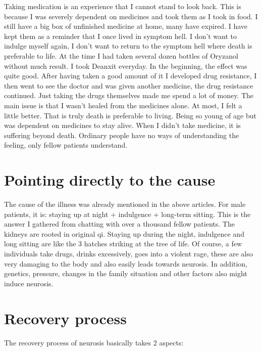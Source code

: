 \documentclass[
]{book}
\begin{document}
Taking medication is an experience that I cannot stand to look back. This is because I was severely dependent on medicines and took them as I took in food. I still have a big box of unfinished medicine at home, many have expired. I have kept them as a reminder that I once lived in symptom hell. I don't want to indulge myself again, I don't want to return to the symptom hell where death is preferable to life. At the time I had taken several dozen bottles of Oryzanol without much result. I took Deanxit everyday. In the beginning, the effect was quite good. After having taken a good amount of it I developed drug resistance, I then went to see the doctor and was given another medicine, the drug resistance continued. Just taking the drugs themselves made me spend a lot of money. The main issue is that I wasn't healed from the medicines alone. At most, I felt a little better. That is truly death is preferable to living. Being so young of age but was dependent on medicines to stay alive. When I didn't take medicine, it is suffering beyond death. Ordinary people have no ways of understanding the feeling, only fellow patients understand.

\hypertarget{pointing-directly-to-the-cause}{%
\section{Pointing directly to the cause}\label{pointing-directly-to-the-cause}}

The cause of the illness was already mentioned in the above articles. For male patients, it is: staying up at night + indulgence + long-term sitting. This is the answer I gathered from chatting with over a thousand fellow patients. The kidneys are rooted in original qi. Staying up during the night, indulgence and long sitting are like the 3 hatches striking at the tree of life. Of course, a few individuals take drugs, drinks excessively, goes into a violent rage, these are also very damaging to the body and also easily leads towards neurosis. In addition, genetics, pressure, changes in the family situation and other factors also might induce neurosis.

\hypertarget{recovery-process}{%
\section{Recovery process}\label{recovery-process}}

The recovery process of neurosis basically takes 2 aspects:
\end{document}

